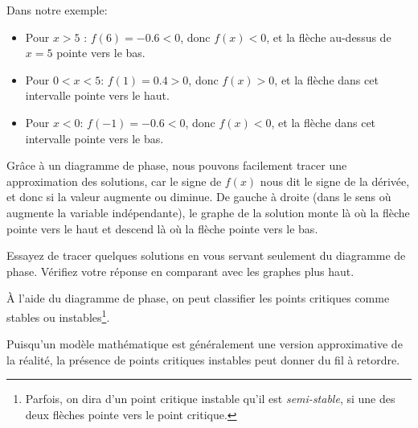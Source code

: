 Dans notre exemple:
\begin{itemize}
	\item Pour $x > 5$ : $f(6) = -0.6 < 0$, donc $f(x) < 0$, et la flèche au-dessus de $x=5$ pointe vers le bas.
	\item Pour $0 < x < 5$: $f(1) = 0.4 > 0$, donc $f(x) > 0$, et la flèche dans cet intervalle pointe vers le haut.
	\item Pour $x <0$: $f(-1) = -0.6 < 0$, donc $f(x) < 0$, et la flèche dans cet intervalle pointe vers le bas.
\end{itemize}

\begin{center}
\end{center}

\pagebreak[0]
Grâce à un diagramme de phase, nous pouvons facilement tracer une approximation des solutions, car le signe de $f(x)$ nous dit le signe de la dérivée, et donc si la valeur augmente ou diminue.
De gauche à droite (dans le sens où augmente la variable indépendante),
le graphe de la solution monte là où la flèche pointe vers le haut et descend là où la flèche pointe vers le bas.

\begin{exercise}
Essayez de tracer quelques solutions en vous servant seulement du diagramme de phase.
Vérifiez votre réponse en comparant avec les graphes plus haut.
\end{exercise}

\pagebreak[0]
À l'aide du diagramme de phase, on peut classifier les points critiques comme stables ou instables\footnote{Parfois, on dira d'un point critique instable qu'il est \emph{semi-stable}, si une des deux flèches pointe vers le point critique.}.

\begin{center}
\end{center}

Puisqu'un modèle mathématique est généralement une version approximative de la réalité,
la présence de points critiques instables peut donner du fil à retordre.

